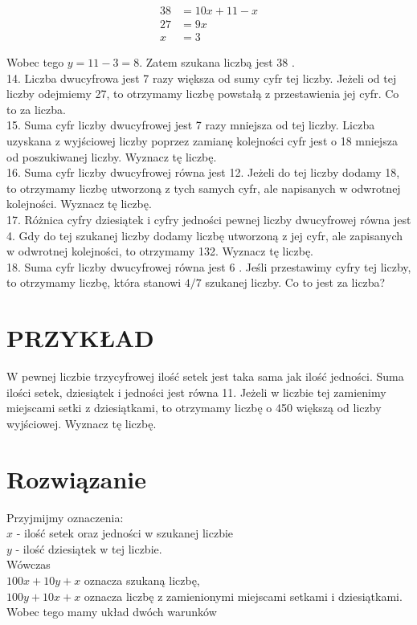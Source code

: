 \documentclass[10pt]{article}
\begin{document}
\[
\begin{aligned}
38 & =10 x+11-x \\
27 & =9 x \\
x & =3
\end{aligned}
\]

Wobec tego \(y=11-3=8\). Zatem szukana liczbą jest 38 .\\
14. Liczba dwucyfrowa jest 7 razy większa od sumy cyfr tej liczby. Jeżeli od tej liczby odejmiemy 27, to otrzymamy liczbę powstałą z przestawienia jej cyfr. Co to za liczba.\\
15. Suma cyfr liczby dwucyfrowej jest 7 razy mniejsza od tej liczby. Liczba uzyskana z wyjściowej liczby poprzez zamianę kolejności cyfr jest o 18 mniejsza od poszukiwanej liczby. Wyznacz tę liczbę.\\
16. Suma cyfr liczby dwucyfrowej równa jest 12. Jeżeli do tej liczby dodamy 18, to otrzymamy liczbę utworzoną z tych samych cyfr, ale napisanych w odwrotnej kolejności. Wyznacz tę liczbę.\\
17. Różnica cyfry dziesiątek i cyfry jedności pewnej liczby dwucyfrowej równa jest 4. Gdy do tej szukanej liczby dodamy liczbę utworzoną z jej cyfr, ale zapisanych w odwrotnej kolejności, to otrzymamy 132. Wyznacz tę liczbę.\\
18. Suma cyfr liczby dwucyfrowej równa jest 6 . Jeśli przestawimy cyfry tej liczby, to otrzymamy liczbę, która stanowi \(4 / 7\) szukanej liczby. Co to jest za liczba?

\section*{PRZYKŁAD}
W pewnej liczbie trzycyfrowej ilość setek jest taka sama jak ilość jedności. Suma ilości setek, dziesiątek i jedności jest równa 11. Jeżeli w liczbie tej zamienimy miejscami setki z dziesiątkami, to otrzymamy liczbę o 450 większą od liczby wyjściowej. Wyznacz tę liczbę.

\section*{Rozwiązanie}
Przyjmijmy oznaczenia:\\
\(x\) - ilość setek oraz jedności w szukanej liczbie\\
\(y\) - ilość dziesiątek w tej liczbie.\\
Wówczas\\
\(100 x+10 y+x\) oznacza szukaną liczbę,\\
\(100 y+10 x+x\) oznacza liczbę z zamienionymi miejscami setkami i dziesiątkami.\\
Wobec tego mamy układ dwóch warunków
\end{document}
